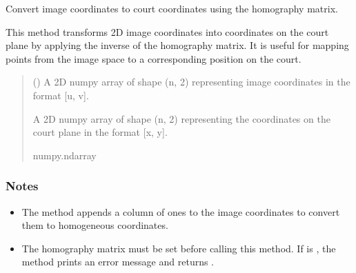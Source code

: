\documentclass[letterpaper,10pt,english]{sphinxmanual}
\begin{document}
\begin{fulllineitems}
\begin{fulllineitems}
\begin{itemize}
\begin{description}
\end{description}

\end{itemize}

\end{fulllineitems}


\begin{fulllineitems}
\label{\detokenize{CameraUtils:id14}}
\pysigstartsignatures
{}
\pysigstopsignatures
\sphinxAtStartPar
Convert image coordinates to court coordinates using the homography matrix.

\sphinxAtStartPar
This method transforms 2D image coordinates into coordinates on the court plane
by applying the inverse of the homography matrix. It is useful for mapping points
from the image space to a corresponding position on the court.
\begin{quote}\begin{description}
\sphinxAtStartPar
{} () \textendash{} A 2D numpy array of shape (n, 2) representing image coordinates in the format {[}u, v{]}.

\sphinxAtStartPar
A 2D numpy array of shape (n, 2) representing the coordinates on the court plane in the format {[}x, y{]}.

\sphinxAtStartPar
numpy.ndarray

\end{description}\end{quote}
\subsubsection*{Notes}
\begin{itemize}
\item {} 
\sphinxAtStartPar
The method appends a column of ones to the image coordinates to convert them to homogeneous coordinates.

\item {} 
\sphinxAtStartPar
The homography matrix  must be set before calling this method. If  is , the method prints an error message and returns .


\end{itemize}
\end{fulllineitems}
\end{fulllineitems}
\end{document}
